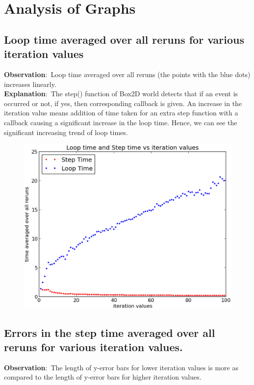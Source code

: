 \documentclass[a4paper,11pt]{article}
\begin{document}
\section{Analysis of Graphs}
{
\subsection{Loop time averaged over all reruns for various iteration values}
{
\indent \indent \textbf{Observation}$:$ Loop time averaged over all reruns (the points with the blue dots) increases linearly.\\
\indent \textbf{Explanation}$:$ The step() function of Box2D world detects that if an event is occurred or not, if yes, then corresponding callback is given. An increase in the iteration value means addition of time taken for an extra
 step function with a callback causing a significant increase in the loop time. Hence, we can see the significant
 increasing trend of loop times.
 
 \begin{figure}[h]
    \centering
    \includegraphics[scale = 0.5]{plot1}
\end{figure}
}


\subsection{Errors in the step time averaged over all reruns for various iteration values.}
{
\indent \indent \textbf{Observation}$:$ The length of y-error bars for lower iteration values is more as compared to the length of
 y-error bars for higher iteration values.\\
 
}}
\end{document}
